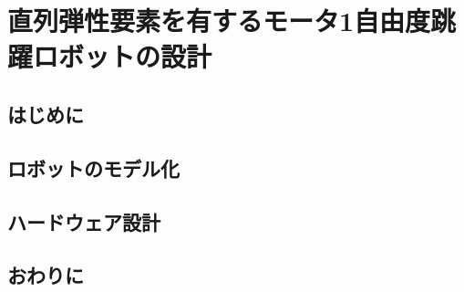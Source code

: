 \chapter[直列弾性要素を有するモータ1自由度跳躍ロボットの設計]%
        {直列弾性要素を有するモータ1自由度跳躍ロボットの設計}
\section{はじめに}
\section{ロボットのモデル化}
\section{ハードウェア設計}
\section{おわりに}
